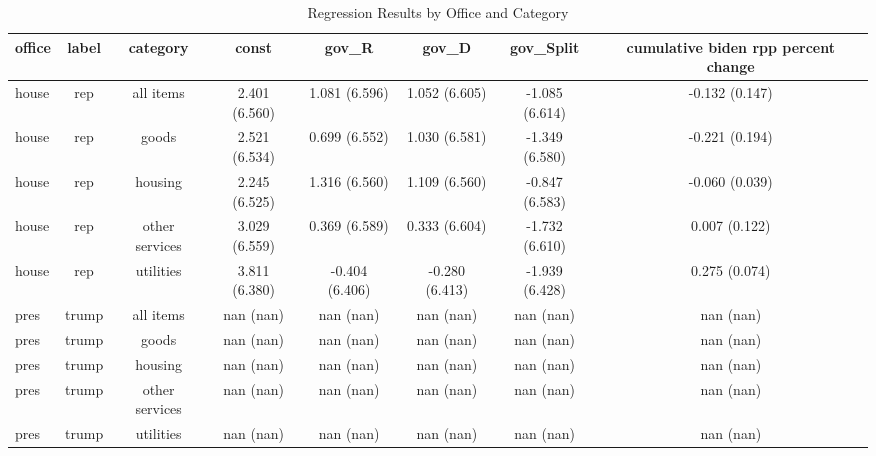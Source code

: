 \begin{table}
\caption{Regression Results by Office and Category}
\label{tab:regression_results}
\begin{tabular}{lccccccc}
\toprule
office & label & category & const & gov_R & gov_D & gov_Split & cumulative biden rpp percent change \\
\midrule
house & rep & all items & 2.401 (6.560) & 1.081 (6.596) & 1.052 (6.605) & -1.085 (6.614) & -0.132 (0.147) \\
house & rep & goods & 2.521 (6.534) & 0.699 (6.552) & 1.030 (6.581) & -1.349 (6.580) & -0.221 (0.194) \\
house & rep & housing & 2.245 (6.525) & 1.316 (6.560) & 1.109 (6.560) & -0.847 (6.583) & -0.060 (0.039) \\
house & rep & other services & 3.029 (6.559) & 0.369 (6.589) & 0.333 (6.604) & -1.732 (6.610) & 0.007 (0.122) \\
house & rep & utilities & 3.811 (6.380) & -0.404 (6.406) & -0.280 (6.413) & -1.939 (6.428) & 0.275 (0.074) \\
pres & trump & all items & nan (nan) & nan (nan) & nan (nan) & nan (nan) & nan (nan) \\
pres & trump & goods & nan (nan) & nan (nan) & nan (nan) & nan (nan) & nan (nan) \\
pres & trump & housing & nan (nan) & nan (nan) & nan (nan) & nan (nan) & nan (nan) \\
pres & trump & other services & nan (nan) & nan (nan) & nan (nan) & nan (nan) & nan (nan) \\
pres & trump & utilities & nan (nan) & nan (nan) & nan (nan) & nan (nan) & nan (nan) \\
\bottomrule
\end{tabular}
\end{table}
